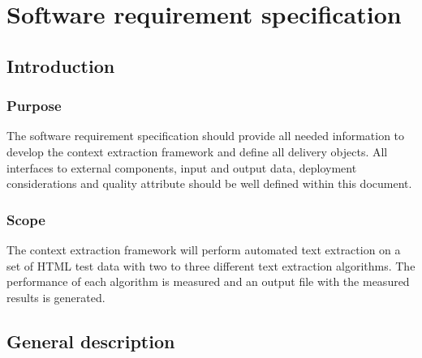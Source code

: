 
\chapter{Software requirement specification} %

\label{ChapterX} %



\section{Introduction}



\subsection{Purpose}

The software requirement specification should provide all needed information to develop the context extraction framework and define all delivery objects. All interfaces to external components, input and output data, deployment considerations and quality attribute should be well defined within this document.


\subsection{Scope}


The context extraction framework will perform automated text extraction on a set of HTML test data with two to three different text extraction algorithms. The performance of each algorithm is measured and an output file with the measured results is generated.


\section{General description}


